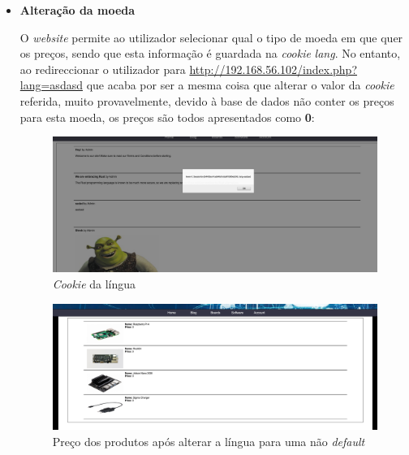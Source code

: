 \documentclass[10pt,english]{article}
\begin{document}
\begin{itemize}
    \item \textbf{Alteração da moeda}
    \par O \textit{website} permite ao utilizador selecionar qual o tipo de moeda em que quer os preços, sendo que esta informação é guardada na \textit{cookie} \textit{lang}. No entanto, ao redireccionar o utilizador para \url{http://192.168.56.102/index.php?lang=asdasd} que acaba por ser a mesma coisa que alterar o valor da \textit{cookie} referida, muito provavelmente, devido à base de dados não conter os preços para esta moeda, os preços são todos apresentados como \textbf{0}:
    
     \begin{figure}[!h]
        \centering
        \includegraphics[width=\textwidth]{images/coin.png}
        \caption{\textit{Cookie} da língua}
    \end{figure}
    
     \begin{figure}[!h]
        \centering
        \includegraphics[width=\textwidth]{images/price.png}
        \caption{Preço dos produtos após alterar a língua para uma não \textit{default}}
    \end{figure}
    
    
\end{itemize}

\clearpage


\clearpage
\end{document}
